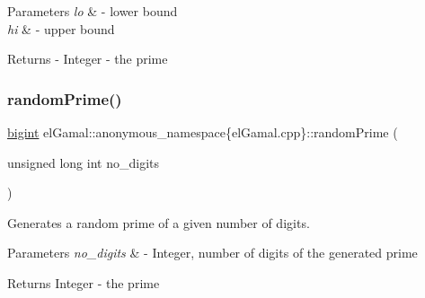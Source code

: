 \begin{DoxyParams}{Parameters}
{\em lo} & -\/ lower bound \\
\hline
{\em hi} & -\/ upper bound\\
\hline
\end{DoxyParams}
\begin{DoxyReturn}{Returns}
-\/ Integer -\/ the prime 
\end{DoxyReturn}
\mbox{\label{namespaceelGamal_1_1anonymous__namespace_02elGamal_8cpp_03_a13863cb7d4c4e633937d3e86d03ab477}} 
\subsubsection{\texorpdfstring{random\+Prime()}{randomPrime()}\hspace{0.1cm}{\footnotesize\ttfamily [2/2]}}
{\footnotesize\ttfamily \mbox{\hyperlink{namespaceelGamal_ab2883bf41ce8d738e2428c8ae81b0245}{bigint}} el\+Gamal\+::anonymous\+\_\+namespace\{el\+Gamal.\+cpp\}\+::random\+Prime (\begin{DoxyParamCaption}\item[{unsigned long int}]{no\+\_\+digits }\end{DoxyParamCaption})}



Generates a random prime of a given number of digits. 


\begin{DoxyParams}{Parameters}
{\em no\+\_\+digits} & -\/ Integer, number of digits of the generated prime\\
\hline
\end{DoxyParams}
\begin{DoxyReturn}{Returns}
Integer -\/ the prime 
\end{DoxyReturn}
\mbox{\label{namespaceelGamal_1_1anonymous__namespace_02elGamal_8cpp_03_a7c87ed0fcfe81fb5eb26c6915de621a5}} 
